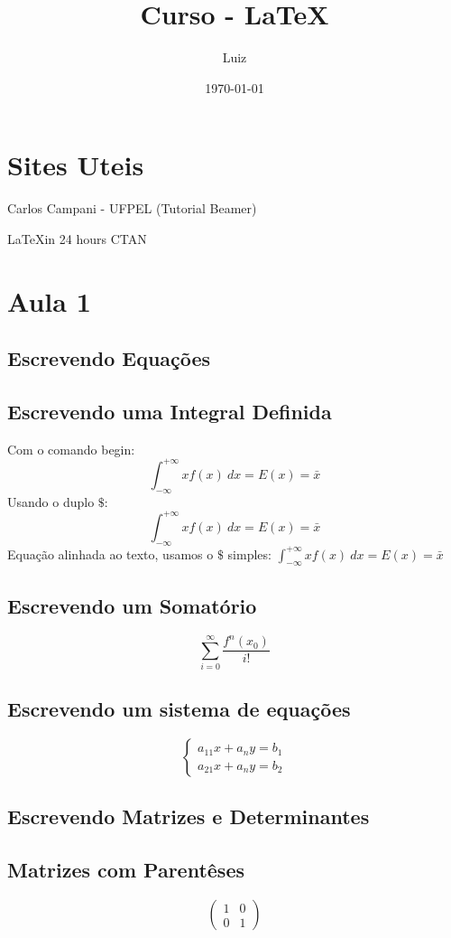 \documentclass[12pt,a4paper]{article}
\title{Curso - \LaTeX}
\author{Luiz}
\date{\today}
\begin{document}
\maketitle

\section{Sites Uteis}
Carlos Campani - UFPEL (Tutorial Beamer)

\LaTeX in 24 hours 
CTAN 
\section{Aula 1}
\subsection{Escrevendo Equações}
\subsection{Escrevendo uma Integral Definida}
Com o comando begin:
\begin{equation}
    \int_{-\infty}^{+\infty}xf(x) \ dx = E(x) = \bar{x}
\end{equation}
Usando o duplo $\$$:
$$\int_{-\infty}^{+\infty}xf(x) \ dx = E(x) = \bar{x}$$
Equação alinhada ao texto, usamos o $\$$ simples:
$\int_{-\infty}^{+\infty}xf(x) \ dx = E(x) = \bar{x}$
\subsection{Escrevendo um Somatório}
\begin{equation}
    \sum_{i=0}^{\infty} \frac{f^{n}(x_{0})}{i!}
\end{equation}
\subsection{Escrevendo um sistema de equações}
\begin{equation}
    \begin{cases}
    a_{11}x + a_{n}y = b_{1} \\
    a_{21}x + a_{n}y = b_{2}
    \end{cases}
\end{equation}
\subsection{Escrevendo Matrizes e Determinantes}
\subsection{Matrizes com Parentêses}
\begin{equation}
    \begin{pmatrix}
    1 & 0\\
    0 & 1
    \end{pmatrix}
\end{equation}
\end{document}
